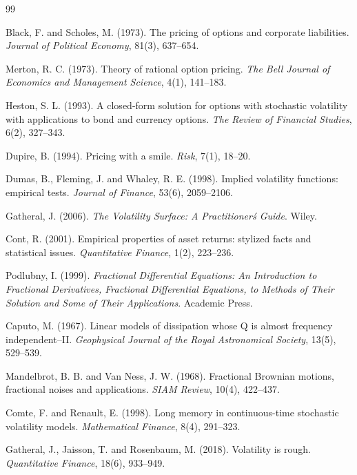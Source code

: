 \documentclass[11pt,a4paper]{report}
\begin{document}
\begin{thebibliography}{99}

Black, F. and Scholes, M. (1973).
The pricing of options and corporate liabilities.
\textit{Journal of Political Economy}, 81(3), 637--654.

Merton, R. C. (1973).
Theory of rational option pricing.
\textit{The Bell Journal of Economics and Management Science}, 4(1), 141--183.

Heston, S. L. (1993).
A closed-form solution for options with stochastic volatility with applications to bond and currency options.
\textit{The Review of Financial Studies}, 6(2), 327--343.

Dupire, B. (1994).
Pricing with a smile.
\textit{Risk}, 7(1), 18--20.

Dumas, B., Fleming, J. and Whaley, R. E. (1998).
Implied volatility functions: empirical tests.
\textit{Journal of Finance}, 53(6), 2059--2106.

Gatheral, J. (2006).
\textit{The Volatility Surface: A Practitioner\'s Guide}.
Wiley.

Cont, R. (2001).
Empirical properties of asset returns: stylized facts and statistical issues.
\textit{Quantitative Finance}, 1(2), 223--236.

Podlubny, I. (1999).
\textit{Fractional Differential Equations: An Introduction to Fractional Derivatives, Fractional Differential Equations, to Methods of Their Solution and Some of Their Applications}.
Academic Press.

Caputo, M. (1967).
Linear models of dissipation whose Q is almost frequency independent--II.
\textit{Geophysical Journal of the Royal Astronomical Society}, 13(5), 529--539.

Mandelbrot, B. B. and Van Ness, J. W. (1968).
Fractional Brownian motions, fractional noises and applications.
\textit{SIAM Review}, 10(4), 422--437.

Comte, F. and Renault, E. (1998).
Long memory in continuous-time stochastic volatility models.
\textit{Mathematical Finance}, 8(4), 291--323.

Gatheral, J., Jaisson, T. and Rosenbaum, M. (2018).
Volatility is rough.
\textit{Quantitative Finance}, 18(6), 933--949.


\end{thebibliography}
\end{document}
